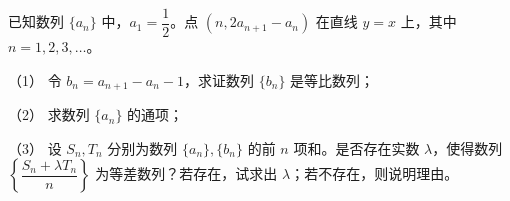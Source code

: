 \begin{question}
已知数列 $\{a_n\}$ 中，$a_1=\dfrac12$。点 $(n,2a_{n+1}-a_n)$ 在直线 $y=x$ 上，其中 $n=1,2,3,\ldots$。

（1） 令 $b_n=a_{n+1}-a_n-1$，求证数列 $\{b_n\}$ 是等比数列；

（2） 求数列 $\{a_n\}$ 的通项；

（3） 设 $S_n,T_n$ 分别为数列 $\{a_n\},\{b_n\}$ 的前 $n$ 项和。是否存在实数 $\lambda$，使得数列 $\left\{\dfrac{S_n+\lambda T_n}{n}\right\}$ 为等差数列？若存在，试求出 $\lambda$；若不存在，则说明理由。

\end{question}